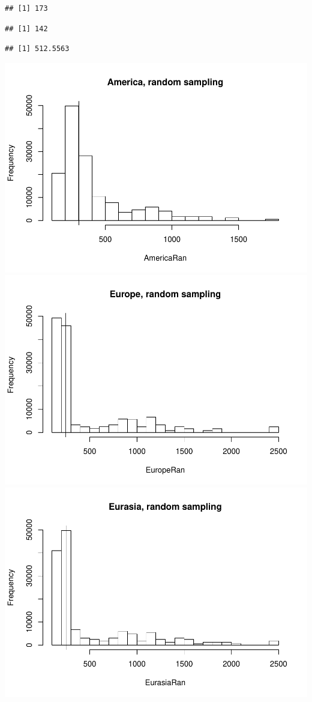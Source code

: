 \documentclass[]{article}
\begin{document}
\begin{verbatim}
## [1] 173
\end{verbatim}

\begin{verbatim}
## [1] 142
\end{verbatim}

\begin{verbatim}
## [1] 512.5563
\end{verbatim}

\includegraphics{MA_JJ_files/figure-latex/RSCon-1.pdf}
\includegraphics{MA_JJ_files/figure-latex/RSCon-2.pdf}
\includegraphics{MA_JJ_files/figure-latex/RSCon-3.pdf}
\end{document}
